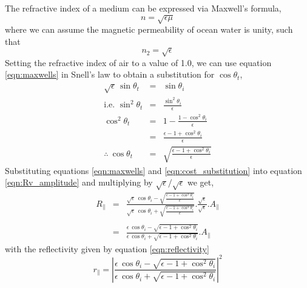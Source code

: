 The refractive index of a medium can be expressed via Maxwell's formula,
\begin{equation*}
  n = \sqrt{\epsilon\mu}
\end{equation*}
where we can assume the magnetic permeability of ocean water is unity, such that
\begin{equation}
  n_{2} = \sqrt{\epsilon}
  \label{eqn:maxwells}
\end{equation}
Setting the refractive index of air to a value of 1.0, we can use equation \ref{eqn:maxwells} in Snell's law to obtain a substitution for $\cos\theta_{t}$,
\begin{eqnarray}
  \sqrt{\epsilon}\,\sin\theta_{t}  &=& \sin\theta_{i}\nonumber\\
  \textrm{i.e. }\sin^{2}\theta_{t} &=& \frac{\sin^{2}\theta_{i}}{\epsilon}\nonumber\\
  \cos^{2}\theta_{t}               &=& 1 - \frac{1 - \cos^{2}\theta_{i}}{\epsilon}\nonumber\\
                                   &=& \frac{\epsilon - 1 + \cos^{2}\theta_{i}}{\epsilon}\nonumber\\
  \therefore\:\cos\theta_{t}       &=& \sqrt{\frac{\epsilon - 1 + \cos^{2}\theta_{i}}{\epsilon}}
  \label{eqn:cost_substitution}
\end{eqnarray}
Substituting equations \ref{eqn:maxwells} and \ref{eqn:cost_substitution} into equation \ref{eqn:Rv_amplitude} and multiplying by $\sqrt{\epsilon}/\sqrt{\epsilon}$ we get,
\begin{eqnarray}
  R_{\parallel} &=& \frac{\sqrt{\epsilon}\,\cos\theta_{i} - \sqrt{\displaystyle\frac{\epsilon - 1 + \cos^{2}\theta_{i}}{\epsilon}}}{\sqrt{\epsilon}\,\cos\theta_{i} + \sqrt{\displaystyle\frac{\epsilon - 1 + \cos^{2}\theta_{i}}{\epsilon}}}.\frac{\sqrt{\epsilon}}{\sqrt{\epsilon}}.A_{\parallel}\nonumber\\\nonumber\\
                &=& \frac{\epsilon\,\cos\theta_{i} - \sqrt{\epsilon - 1 + \cos^{2}\theta_{i}}}{\epsilon\,\cos\theta_{i} + \sqrt{\epsilon - 1 + \cos^{2}\theta_{i}}}.A_{\parallel}
  \label{eqn:Rv_amplitude2}
\end{eqnarray}
with the reflectivity given by equation \ref{eqn:reflectivity}
\begin{equation}
  r_{\parallel} = \left|\frac{\epsilon\,\cos\theta_{i} - \sqrt{\epsilon - 1 + \cos^{2}\theta_{i}}}{\epsilon\,\cos\theta_{i} + \sqrt{\epsilon - 1 + \cos^{2}\theta_{i}}}\right|^{2}
  \label{eqn:Rv_reflectivity}
\end{equation}
